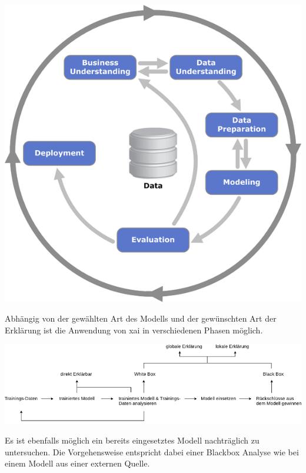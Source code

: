 \documentclass[
  12pt, %
  a4paper, %
  oneside, %
  openany, 
  numbers=noenddot, %
  BCOR=5mm, %
  parskip=half*, %
  thesis, %
]{bfhbook}
\begin{document}
\begin{center}
\begin{minipage}[t]{0.8\linewidth}
	\includegraphics[width=\textwidth]{Bilder/CRISP-DM-Process-Diagram.png}
\end{minipage}
\end{center}

Abhängig von der gewählten Art des Modells und der gewünschten Art der Erklärung ist die Anwendung von \Gls{xai} in verschiedenen Phasen möglich.
\begin{center}
\begin{minipage}[t]{\linewidth}
	\includegraphics[width=\textwidth]{Bilder/XAI-Process.png}
\end{minipage}
\end{center}
Es ist ebenfalls möglich ein bereits eingesetztes Modell nachträglich zu untersuchen. Die Vorgehensweise entspricht dabei einer \Gls{Blackbox} Analyse wie bei einem Modell aus einer externen Quelle. 
\end{document}
